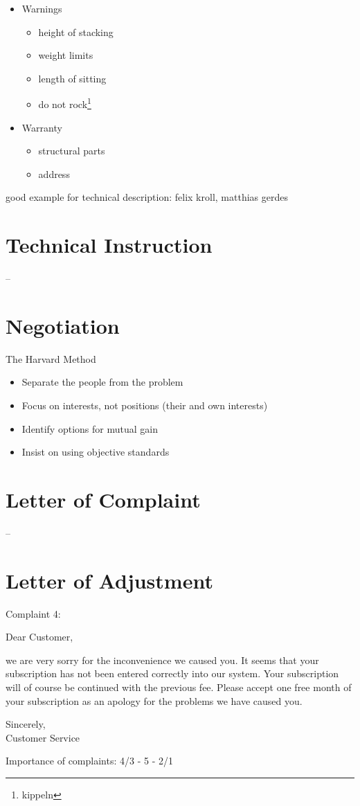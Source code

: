 \documentclass{scrreprt}
\begin{document}
\begin{itemize}
\begin{itemize}
\begin{itemize}
\end{itemize}
\end{itemize}
\item Warnings
\begin{itemize}
\item height of stacking
\item weight limits
\item length of sitting
\item do not rock\footnote{kippeln}
\end{itemize}
\item Warranty
\begin{itemize}
\item structural parts
\item address
\end{itemize}
\end{itemize}

good example for technical description: felix kroll, matthias gerdes

\section{Technical Instruction}
--

\section{Negotiation}
The Harvard Method
\begin{itemize}
\item Separate the people from the problem
\item Focus on interests, not positions (their and own interests)
\item Identify options for mutual gain
\item Insist on using objective standards
\end{itemize}

\section{Letter of Complaint}
--

\section{Letter of Adjustment}
Complaint 4:\medskip

Dear Customer, 

we are very sorry for the inconvenience we caused you. It seems that your subscription has not been entered correctly into our system. Your subscription will of course be continued with the previous fee. Please accept one free month of your subscription as an apology for the problems we have caused you.

Sincerely,\\
Customer Service\medskip

Importance of complaints: 4/3 - 5 - 2/1

\end{document}
